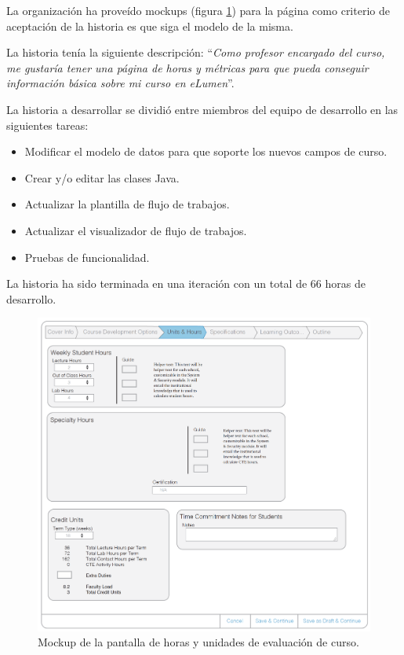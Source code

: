 La organización ha proveído mockups (figura \ref{course_units_hours}) para la página como criterio de aceptación de la historia es que siga el modelo de la misma.

La historia tenía la siguiente descripción: \enquote{\textit{Como profesor encargado del curso, me gustaría tener una página de horas y métricas para que pueda conseguir información básica sobre mi curso en eLumen}}.

La historia a desarrollar se dividió entre miembros del equipo de desarrollo en las siguientes tareas:
\begin{itemize}
	\item Modificar el modelo de datos para que soporte los nuevos campos de curso.
	\item Crear y/o editar las clases Java.
	\item Actualizar la plantilla de flujo de trabajos.
	\item Actualizar el visualizador de flujo de trabajos.
	\item Pruebas de funcionalidad.
\end{itemize}

La historia ha sido terminada en una iteración con un total de 66 horas de desarrollo.

\begin{figure}[H]
\centering
\includegraphics[scale=0.3]{Capitulos/DesarrollodelaAplicacion/Imagenes/course_units_hours}
\caption{Mockup de la pantalla de horas y unidades de evaluación de curso.}
  \label{course_units_hours}
\end{figure}

